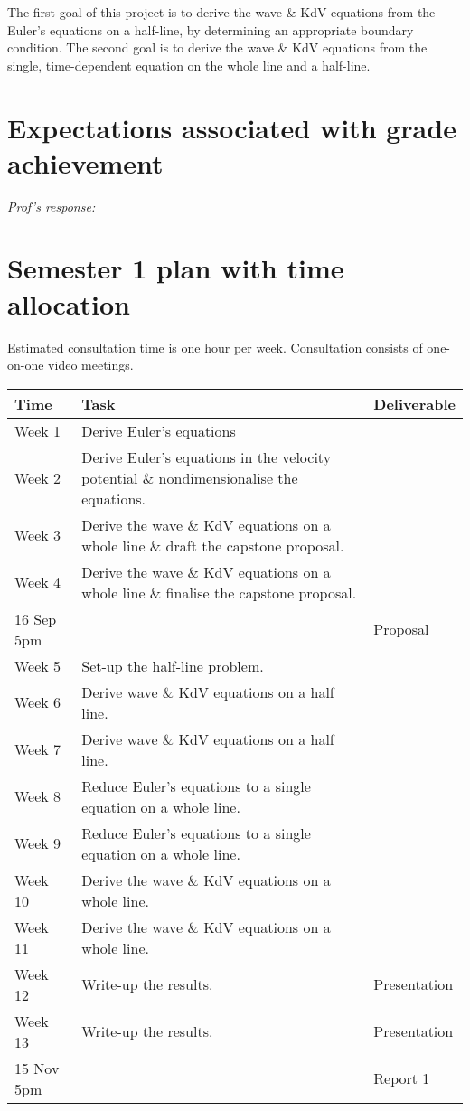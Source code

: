 \documentclass[10pt, oneside, a4paper]{article}
\begin{document}
The first goal of this project is to derive the wave \& KdV equations from the Euler's equations on a half-line, by determining an appropriate boundary condition. The second goal is to derive the wave \& KdV equations from the single, time-dependent equation on the whole line and a half-line.

\section{Expectations associated with grade achievement}

\emph{Prof's response:}
\section{Semester 1 plan with time allocation}

Estimated consultation time is one hour per week. Consultation consists of one-on-one video meetings.

\begin{center}
    \begin{tabular}{|l|l|l|} 
        \hline
        Time & Task & Deliverable\\
        \hline
        Week 1 & Derive Euler's equations & \\ 
        \hline
        Week 2 & Derive Euler's equations in the velocity potential \& nondimensionalise the equations. & \\ 
        \hline
        Week 3 & Derive the wave \& KdV equations on a whole line \& draft the capstone proposal.&\\
        \hline
        Week 4 & Derive the wave \& KdV equations on a whole line \& finalise the capstone proposal. &\\
        \hline 
        16 Sep 5pm & & Proposal\\
        \hline
        Week 5 & Set-up the half-line problem. &\\
        \hline
        Week 6 & Derive wave \& KdV equations on a half line.&\\
        \hline
        Week 7 & Derive wave \& KdV equations on a half line.&\\
        \hline
        Week 8 & Reduce Euler's equations to a single equation on a whole line. &\\
        \hline
        Week 9 & Reduce Euler's equations to a single equation on a whole line. &\\
        \hline
        Week 10 & Derive the wave \& KdV equations on a whole line.&\\
        \hline
        Week 11 & Derive the wave \& KdV equations on a whole line.&\\
        \hline
        Week 12 & Write-up the results.& Presentation\\
        \hline
        Week 13 & Write-up the results.& Presentation\\
        \hline
        15 Nov 5pm & & Report 1\\
        \hline
    \end{tabular}
 
\end{center}
\end{document}
